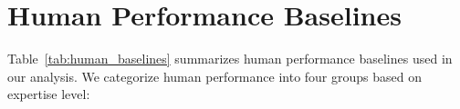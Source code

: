 \documentclass[letterpaper,twocolumn]{article}
\begin{document}





\section{Human Performance Baselines}
\label{app:human_baselines}

Table~\ref{tab:human_baselines} summarizes human performance baselines used in our analysis. We categorize human performance into four groups based on expertise level:
\end{document}
